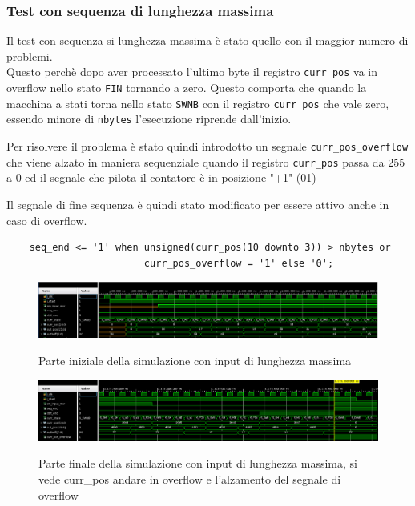 \documentclass[12pt, a4paper]{article}
\begin{document}
\pagebreak

\subsubsection{Test con sequenza di lunghezza massima}

Il test con sequenza si lunghezza massima è stato quello con il maggior numero di problemi. \\
Questo perchè dopo aver processato l'ultimo byte il registro \texttt{curr\_pos} va in overflow
nello stato \texttt{FIN} tornando a zero.
\noindent Questo comporta che quando la macchina a stati torna nello stato \texttt{SWNB} con il registro \texttt{curr\_pos} 
che vale zero, essendo minore di \texttt{nbytes} l'esecuzione riprende dall'inizio.

\noindent Per risolvere il problema è stato quindi introdotto un segnale \texttt{curr\_pos\_overflow} che viene alzato in maniera sequenziale
quando il registro \texttt{curr\_pos} passa da 255 a 0 ed il segnale che pilota il contatore è in posizione "+1" (01)

\noindent Il segnale di fine sequenza è quindi stato modificato per essere attivo anche in caso di
overflow.

\begin{verbatim}
    seq_end <= '1' when unsigned(curr_pos(10 downto 3)) > nbytes or 
                        curr_pos_overflow = '1' else '0';
\end{verbatim}

\begin{figure}[h!]
    \centering
    \includegraphics[scale=0.3]{sim_maxlen_init.png}
    \label{img:sim_max_init}
    \caption{Parte iniziale della simulazione con input di lunghezza massima}
\end{figure}

\begin{figure}[h!]
    \centering
    \includegraphics[scale=0.3]{sim_maxlen_end.png}
    \label{img:sim_max_end}
    \caption{Parte finale della simulazione con input di lunghezza massima, si vede curr\_pos andare in overflow e l'alzamento del segnale di overflow}
\end{figure}
\end{document}
